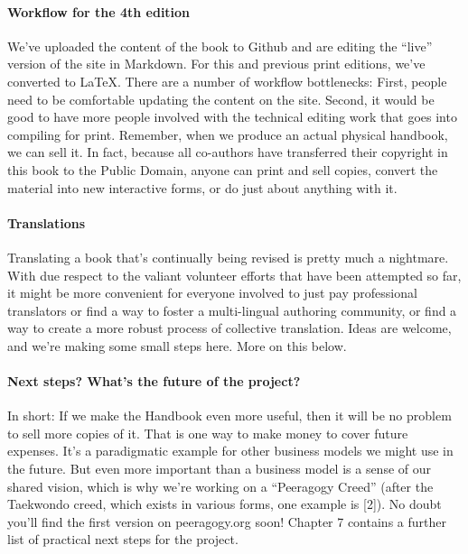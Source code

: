 \hypertarget{workflow-for-the-4th-edition}{%
\paragraph{Workflow for the 4th
edition}\label{workflow-for-the-4th-edition}}

We've uploaded the content of the book to Github and are editing the
``live'' version of the site in Markdown. For this and previous print
editions, we've converted to LaTeX. There are a number of workflow
bottlenecks: First, people need to be comfortable updating the content
on the site. Second, it would be good to have more people involved with
the technical editing work that goes into compiling for print. Remember,
when we produce an actual physical handbook, we can sell it. In fact,
because all co-authors have transferred their copyright in this book to
the Public Domain, anyone can print and sell copies, convert the
material into new interactive forms, or do just about anything with it.

\hypertarget{translations}{%
\paragraph{Translations}\label{translations}}

Translating a book that's continually being revised is pretty much a
nightmare. With due respect to the valiant volunteer efforts that have
been attempted so far, it might be more convenient for everyone involved
to just pay professional translators or find a way to foster a
multi-lingual authoring community, or find a way to create a more robust
process of collective translation. Ideas are welcome, and we're making
some small steps here. More on this below.

\hypertarget{next-steps-whats-the-future-of-the-project}{%
\paragraph{Next steps? What's the future of the
project?}\label{next-steps-whats-the-future-of-the-project}}

In short: If we make the Handbook even more useful, then it will be no
problem to sell more copies of it. That is one way to make money to
cover future expenses. It's a paradigmatic example for other business
models we might use in the future. But even more important than a
business model is a sense of our shared vision, which is why we're
working on a ``Peeragogy Creed'' (after the Taekwondo creed, which
exists in various forms, one example is {[}2{]}). No doubt you'll find
the first version on peeragogy.org soon! Chapter 7 contains a further
list of practical next steps for the project.

